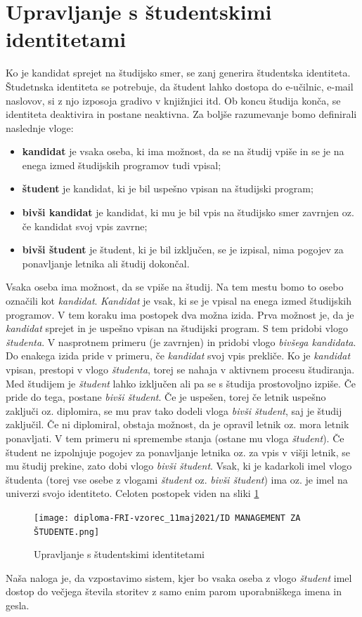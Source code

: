 \documentclass[a4paper,12pt,openright]{book}
\begin{document}
\section{Upravljanje s študentskimi identitetami}
Ko je kandidat sprejet na študijsko smer, se zanj generira študentska identiteta. Študetnska identiteta se potrebuje, da študent lahko dostopa do e-učilnic, e-mail naslovov, si z njo izposoja gradivo v knjižnjici itd. Ob koncu študija konča, se identiteta deaktivira in postane neaktivna. 
Za boljše razumevanje bomo definirali naslednje vloge:
\begin{itemize}
    \item \textbf{kandidat} je vsaka oseba, ki ima možnost, da se na študij vpiše in se je na enega izmed študijskih programov tudi vpisal;
    \item \textbf{študent} je kandidat, ki je bil uspešno vpisan na študijski program;
    \item \textbf{bivši kandidat} je kandidat, ki mu je bil vpis na študijsko smer zavrnjen oz. če kandidat svoj vpis zavrne;
    \item \textbf{bivši študent} je študent, ki je bil izključen, se je izpisal, nima pogojev za ponavljanje letnika ali študij dokončal.
\end{itemize}
Vsaka oseba ima možnost, da se vpiše na študij. Na tem mestu bomo to osebo označili kot \emph{kandidat}. \emph{Kandidat}  je vsak, ki se je vpisal na enega izmed študijskih programov. V tem koraku ima postopek dva možna izida. Prva možnost je, da je \emph{kandidat} sprejet in je uspešno vpisan na študijski program. S tem pridobi vlogo \emph{študenta}. V nasprotnem primeru (je zavrnjen) in pridobi vlogo \emph{bivšega kandidata}. Do enakega izida pride v primeru, če \emph{kandidat} svoj vpis prekliče. \newline
Ko je \emph{kandidat} vpisan, prestopi v vlogo \emph{študenta}, torej se nahaja v aktivnem procesu študiranja. Med študijem je \emph{študent} lahko izključen ali pa se s študija prostovoljno izpiše. Če pride do tega, postane \emph{bivši študent}. Če je uspešen, torej če letnik uspešno zaključi oz. diplomira, se mu prav tako dodeli vloga \emph{bivši študent}, saj je študij zaključil. Če ni diplomiral, obstaja možnost, da je opravil letnik oz. mora letnik ponavljati. V tem primeru ni spremembe stanja (ostane mu vloga \emph{študent}). Če študent ne izpolnjuje pogojev za ponavljanje letnika oz. za vpis v višji letnik, se mu študij prekine, zato dobi vlogo \emph{bivši študent}.
Vsak, ki je kadarkoli imel vlogo študenta (torej vse osebe z vlogami \emph{študent} oz. \emph{bivši študent}) ima oz. je imel na univerzi svojo identiteto. 
Celoten postopek viden na sliki \ref{fig:student}
\begin{figure}[H]
    \centering
    \texttt{[image: diploma-FRI-vzorec\_11maj2021/ID MANAGEMENT ZA ŠTUDENTE.png]}
    \caption{\label{fig:student} Upravljanje s študentskimi identitetami}
\end{figure}
Naša naloga je, da vzpostavimo sistem, kjer bo vsaka oseba z vlogo \emph{študent} imel dostop do večjega števila storitev z samo enim parom uporabniškega imena in gesla. 
\end{document}

